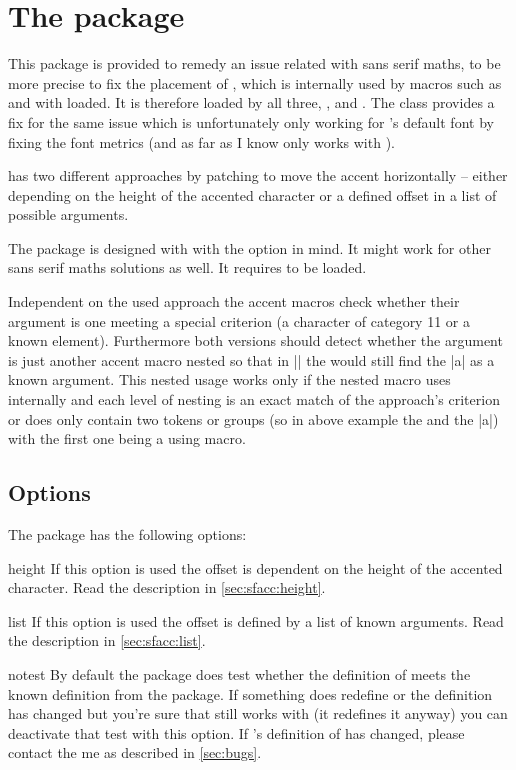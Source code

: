 \chapter{The  package}\label{sec:sfacc}
This package is provided to remedy an issue related with sans serif maths, to be
more precise to fix the placement of , which is internally used
by macros such as  and  with  loaded. It is
therefore loaded by all three, ,  and
. The  class provides a fix for the same issue which
is unfortunately only working for 's default font by fixing the font
metrics (and as far as I know only works with ).

 has two different approaches by patching  to move
the accent horizontally -- either depending on the height of the accented
character or a defined offset in a list of possible arguments.

The package is designed with  with the  option in
mind. It might work for other sans serif maths solutions as well. It requires
 to be loaded.

Independent on the used approach the accent macros check whether their argument
is one meeting a special criterion (a character of category 11 or a known
element). Furthermore both versions should detect whether the argument is just
another accent macro nested so that in \bverb|| the  would
still find the |a| as a known argument. This nested usage works only if the
nested macro uses  internally and each level of nesting is an
exact match of the approach's criterion or does only contain two tokens or
groups (so in above example the  and the |{a}|) with the first one being
a  using macro.

\section{Options}%
The package has the following options:
\begin{describeopt}{height}
  If this option is used the offset is dependent on the height of the accented
  character. Read the description in \autoref{sec:sfacc:height}.
\end{describeopt}
\begin{describeopt}{list}
  If this option is used the offset is defined by a list of known arguments.
  Read the description in \autoref{sec:sfacc:list}.
\end{describeopt}
\begin{describeopt}{notest}
  By default the package does test whether the definition of 
  meets the known definition from the  package. If something does
  redefine  or the definition has changed but you're sure that
   still works with (it redefines it anyway) you can deactivate
  that test with this option. If 's definition of 
  has changed, please contact the me as described in \autoref{sec:bugs}.
\end{describeopt}

